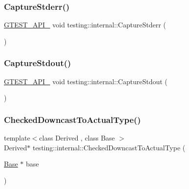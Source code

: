 \mbox{\label{namespacetesting_1_1internal_a8ec00d458d0d442bd64af7b5f9c22dda}} 
\subsubsection{\texorpdfstring{CaptureStderr()}{CaptureStderr()}}
{\footnotesize\ttfamily \mbox{\hyperlink{gtest-port_8h_aa73be6f0ba4a7456180a94904ce17790}{G\+T\+E\+S\+T\+\_\+\+A\+P\+I\+\_\+}} void testing\+::internal\+::\+Capture\+Stderr (\begin{DoxyParamCaption}{ }\end{DoxyParamCaption})}

\mbox{\label{namespacetesting_1_1internal_acba06d4f0343dec407738ba5544af990}} 
\subsubsection{\texorpdfstring{CaptureStdout()}{CaptureStdout()}}
{\footnotesize\ttfamily \mbox{\hyperlink{gtest-port_8h_aa73be6f0ba4a7456180a94904ce17790}{G\+T\+E\+S\+T\+\_\+\+A\+P\+I\+\_\+}} void testing\+::internal\+::\+Capture\+Stdout (\begin{DoxyParamCaption}{ }\end{DoxyParamCaption})}

\mbox{\label{namespacetesting_1_1internal_abfe9bfb020d38aa4e0e12c001911b22b}} 
\subsubsection{\texorpdfstring{CheckedDowncastToActualType()}{CheckedDowncastToActualType()}}
{\footnotesize\ttfamily template$<$class Derived , class Base $>$ \\
Derived$\ast$ testing\+::internal\+::\+Checked\+Downcast\+To\+Actual\+Type (\begin{DoxyParamCaption}\item[{\mbox{\hyperlink{classBase}{Base}} $\ast$}]{base }\end{DoxyParamCaption})}

